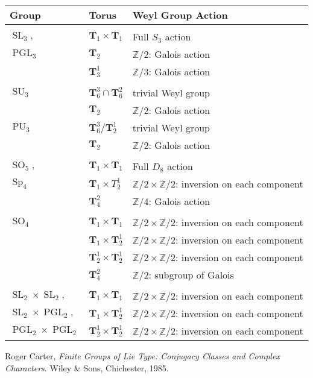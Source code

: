 \documentclass[11pt]{amsart}
\theoremstyle{plain}
\theoremstyle{definition}
\DeclareMathOperator{\PGL}{PGL}
\DeclareMathOperator{\SL}{SL}
\DeclareMathOperator{\SU}{SU}
\DeclareMathOperator{\PU}{PU}
\DeclareMathOperator{\SO}{SO}
\DeclareMathOperator{\Sp}{Sp}
\newcommand{\ZZ}{\mathbb{Z}}
\newcommand{\T}{\mathbf{T}}
\begin{document}
\begin{tabular}{l|l|l}
Group & Torus & Weyl Group Action \\
\hline && \\
$\SL_3,$ & $\T_1 \times \T_1$ & Full $S_3$ action \\
$\PGL_3$ & $\T_2$ & $\ZZ/2$: Galois action \\
& $\T_3^1$ & $\ZZ/3$: Galois action \\
\hline && \\
$\SU_3$ & $\T_6^3 \cap \T_6^2$ & trivial Weyl group \\
& $\T_2$ & $\ZZ/2$: Galois action \\
$\PU_3$ & $\T_6^3 / \T_2^1$ & trivial Weyl group \\
& $\T_2$ & $\ZZ/2$: Galois action \\
\hline && \\
$\SO_5,$ & $\T_1 \times \T_1$ & Full $D_8$ action \\
$\Sp_4$ & $\T_1 \times T_2^1$ & $\ZZ/2 \times \ZZ/2$: inversion on each component \\
& $\T_4^2$ & $\ZZ/4$: Galois action \\
\hline && \\
$\SO_4$ & $\T_1 \times \T_1$ & $\ZZ / 2 \times \ZZ / 2$: inversion on each component \\
& $\T_1 \times \T_2^1$ & $\ZZ / 2 \times \ZZ / 2$: inversion on each component \\
& $\T_2^1 \times \T_2^1$ & $\ZZ / 2 \times \ZZ / 2$: inversion on each component \\
& $\T_4^2$ & $\ZZ / 2$: subgroup of Galois \\
\hline && \\
$\SL_2 \times \SL_2,$ & $\T_1 \times \T_1$ & $\ZZ / 2 \times \ZZ / 2$: inversion on each component \\
$\SL_2 \times \PGL_2,$ & $\T_1 \times \T_2^1$ & $\ZZ / 2 \times \ZZ / 2$: inversion on each component \\
$\PGL_2 \times \PGL_2$ & $\T_2^1 \times \T_2^1$& $\ZZ / 2 \times \ZZ / 2$: inversion on each component
\end{tabular}

\begin{thebibliography}{9}
  Roger Carter,
  \emph{Finite Groups of Lie Type: Conjugacy Classes and Complex Characters}.  Wiley \& Sons, Chichester, 1985.
\end{thebibliography}
\end{document}
